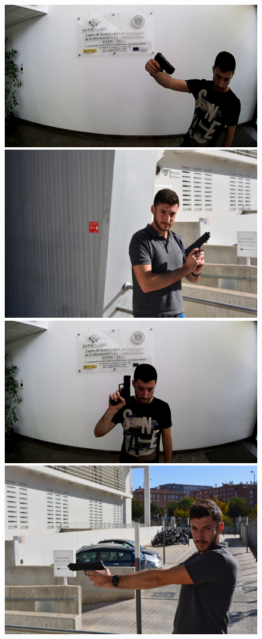 \documentclass[a4paper]{article}
\begin{document}
\begin{figure}[h]
	\center
	\begin{multicols}{4}
		\includegraphics[width=0.9\linewidth]{fig/pistola_z3v5_09}
		\includegraphics[width=0.9\linewidth]{fig/pistol_9047}
		\includegraphics[width=0.9\linewidth]{fig/pistola_z3v3_09}
		\includegraphics[width=0.9\linewidth]{fig/pistol_9048}

\end{multicols}
\end{figure}
\end{document}
